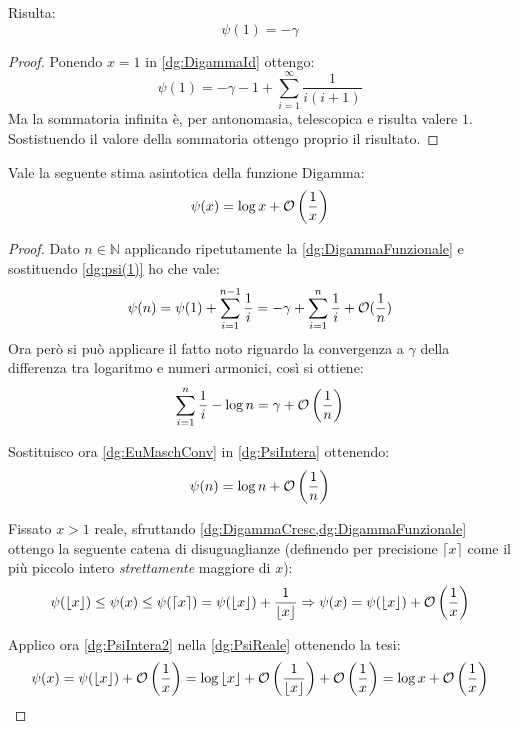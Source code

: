 \begin{corollary}\label{dg:psi(1)}
	Risulta:
	\begin{equation*}
		\psi(1)=-\gamma
	\end{equation*}
\end{corollary}
\begin{proof}
	Ponendo $x=1$ in \cref{dg:DigammaId} ottengo:
	\begin{equation*}
		\psi(1)=-\gamma-1+\sum_{i=1}^{\infty}\frac 1{i(i+1)}
	\end{equation*}
	Ma la sommatoria infinita è, per antonomasia, telescopica e risulta valere $1$. Sostistuendo il valore della sommatoria
	ottengo proprio il risultato.
\end{proof}

\begin{theorem}\label{dg:psiApprox}
	Vale la seguente stima asintotica della funzione Digamma:
	\begin{equation*}
		\psi(x)=\log{x}+\mathcal{O}\left(\frac 1x\right)
	\end{equation*}
\end{theorem}
\begin{proof}
	Dato $n\in\mathbb{N}$ applicando ripetutamente la \cref{dg:DigammaFunzionale} e sostituendo \cref{dg:psi(1)}
	ho che vale:
	\begin{equation}\label{dg:PsiIntera}
		\psi(n)=\psi(1)+\sum_{i=1}^{n-1}\frac 1i = -\gamma+\sum_{i=1}^{n}\frac 1i + \mathcal{O}(\frac 1n)
	\end{equation}
	Ora però si può applicare il fatto noto riguardo la convergenza a $\gamma$ della differenza tra logaritmo e numeri armonici, 
	così si ottiene:
	\begin{equation}\label{dg:EuMaschConv}
		\sum_{i=1}^{n}\frac 1i - \log n = \gamma +\mathcal{O}\left(\frac 1n\right)
	\end{equation}
	
	Sostituisco ora \cref{dg:EuMaschConv} in \cref{dg:PsiIntera} ottenendo:
	\begin{equation}\label{dg:PsiIntera2}
		\psi(n)=\log n +\mathcal{O}\left(\frac 1n\right)
	\end{equation}

	Fissato $x>1$ reale, sfruttando \cref{dg:DigammaCresc,dg:DigammaFunzionale} ottengo la seguente catena di
	disuguaglianze (definendo per precisione $\lceil x\rceil$ come il più piccolo intero \emph{strettamente} maggiore di $x$):
	\begin{equation}\label{dg:PsiReale}
		\psi(\left\lfloor x \right\rfloor)\le \psi(x) \le \psi(\lceil x\rceil)=\psi(\left\lfloor x \right\rfloor)+\frac 1{\left\lfloor x \right\rfloor} \Rightarrow
		\psi(x)=\psi(\left\lfloor x \right\rfloor)+\mathcal{O}\left(\frac 1x\right)
	\end{equation}

	Applico ora \cref{dg:PsiIntera2} nella \cref{dg:PsiReale} ottenendo la tesi:
	\begin{equation*}
		\psi(x)=\psi(\left\lfloor x \right\rfloor)+\mathcal{O}\left(\frac 1x\right)=
		\log{\ensuremath{\left\lfloor x \right\rfloor} }+\mathcal{O}\left(\frac 1{\left\lfloor x \right\rfloor}\right)+\mathcal{O}\left(\frac 1x\right)=
		\log{x}+\mathcal{O}\left(\frac 1x\right)
	\end{equation*}
\end{proof}


